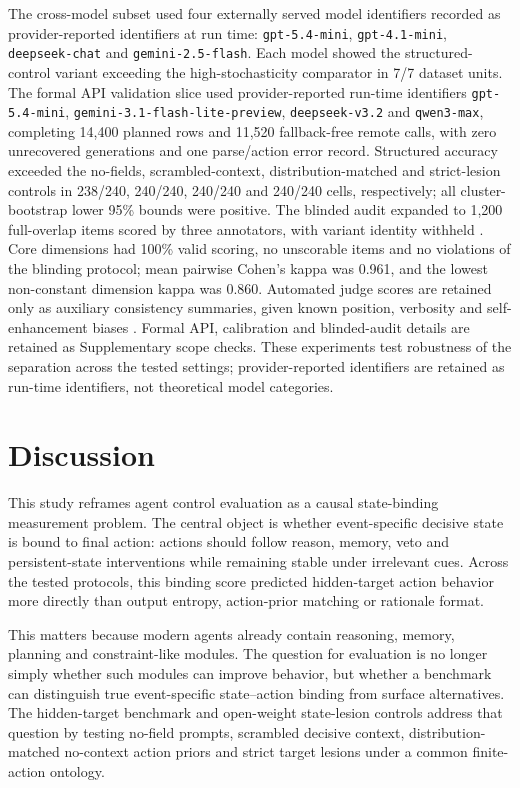 ﻿\documentclass[preprint,12pt,authoryear]{elsarticle}
\begin{document}
The cross-model subset used four externally served model identifiers recorded as provider-reported identifiers at run time: \texttt{gpt-5.4-mini}, \texttt{gpt-4.1-mini}, \texttt{deepseek-chat} and \texttt{gemini-2.5-flash}. Each model showed the structured-control variant exceeding the high-stochasticity comparator in 7/7 dataset units. The formal API validation slice used provider-reported run-time identifiers \texttt{gpt-5.4-mini}, \texttt{gemini-3.1-flash-lite-preview}, \texttt{deepseek-v3.2} and \texttt{qwen3-max}, completing 14,400 planned rows and 11,520 fallback-free remote calls, with zero unrecovered generations and one parse/action error record. Structured accuracy exceeded the no-fields, scrambled-context, distribution-matched and strict-lesion controls in 238/240, 240/240, 240/240 and 240/240 cells, respectively; all cluster-bootstrap lower 95\% bounds were positive. The blinded audit expanded to 1,200 full-overlap items scored by three annotators, with variant identity withheld \citep{cohen1960coefficient}. Core dimensions had 100\% valid scoring, no unscorable items and no violations of the blinding protocol; mean pairwise Cohen's kappa was 0.961, and the lowest non-constant dimension kappa was 0.860. Automated judge scores are retained only as auxiliary consistency summaries, given known position, verbosity and self-enhancement biases \citep{zheng2023judge}. Formal API, calibration and blinded-audit details are retained as Supplementary scope checks. These experiments test robustness of the separation across the tested settings; provider-reported identifiers are retained as run-time identifiers, not theoretical model categories.

\section{Discussion}

This study reframes agent control evaluation as a causal state-binding measurement problem. The central object is whether event-specific decisive state is bound to final action: actions should follow reason, memory, veto and persistent-state interventions while remaining stable under irrelevant cues. Across the tested protocols, this binding score predicted hidden-target action behavior more directly than output entropy, action-prior matching or rationale format.

This matters because modern agents already contain reasoning, memory, planning and constraint-like modules. The question for evaluation is no longer simply whether such modules can improve behavior, but whether a benchmark can distinguish true event-specific state--action binding from surface alternatives. The hidden-target benchmark and open-weight state-lesion controls address that question by testing no-field prompts, scrambled decisive context, distribution-matched no-context action priors and strict target lesions under a common finite-action ontology.
\end{document}
